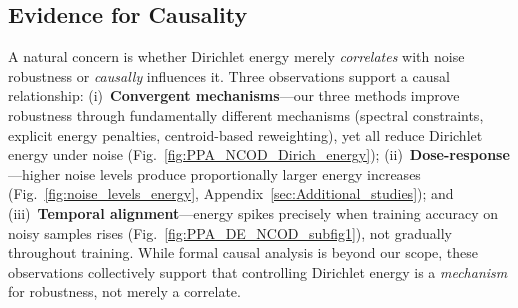 

\subsection{Evidence for Causality}

A natural concern is whether Dirichlet energy merely \emph{correlates} with noise robustness or \emph{causally} influences it. Three observations support a causal relationship: (i)~\textbf{Convergent mechanisms}---our three methods improve robustness through fundamentally different mechanisms (spectral constraints, explicit energy penalties, centroid-based reweighting), yet all reduce Dirichlet energy under noise (Fig.~\ref{fig:PPA_NCOD_Dirich_energy}); (ii)~\textbf{Dose-response}---higher noise levels produce proportionally larger energy increases (Fig.~\ref{fig:noise_levels_energy}, Appendix~\ref{sec:Additional_studies}); and (iii)~\textbf{Temporal alignment}---energy spikes precisely when training accuracy on noisy samples rises (Fig.~\ref{fig:PPA_DE_NCOD_subfig1}), not gradually throughout training. While formal causal analysis is beyond our scope, these observations collectively support that controlling Dirichlet energy is a \emph{mechanism} for robustness, not merely a correlate.